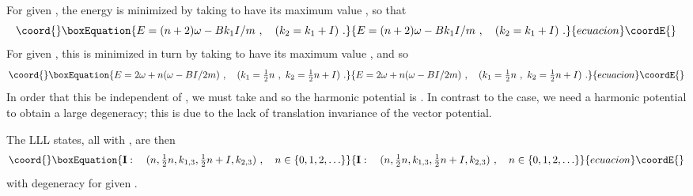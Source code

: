 \documentclass[a4paper,12pt]{article}
\providecommand{\half}{{\textstyle \frac{1}{2}}}
\begin{document}
For given \coordHE{}, the energy is minimized by taking \coordHE{} to have its
maximum value \coordHE{}, so that
\begin{equation}\coord{}\boxEquation{
E =  (n+2)\omega - {B} k_1 I/m\ ,\quad (k_2 = k_1 + I)\ .
}{
E =  (n+2)\omega - {B} k_1 I/m\ ,\quad (k_2 = k_1 + I)\ .
}{ecuacion}\coordE{}\end{equation}
For given \coordHE{}, this is minimized in turn by taking \coordHE{} to have its
maximum value \myHighlight{$\half n$}\coordHE{}, and so
\begin{equation}\coord{}\boxEquation{
E =  2\omega + n (\omega - {BI}/{2m}) \ ,\quad (k_1 = \half n\ ,\ k_2 =
\half n + I)\ .
}{
E =  2\omega + n (\omega - {BI}/{2m}) \ ,\quad (k_1 = \half n\ ,\ k_2 =
\half n + I)\ .
}{ecuacion}\coordE{}\end{equation}
In order that this be independent of \coordHE{}, we must take \coordHE{} and so the harmonic potential is \coordHE{}.  In
contrast to the \coordHE{} case, we need a harmonic potential to obtain a
large degeneracy; this is due to the lack of translation invariance of the
vector potential.

The LLL states, all with \coordHE{}, are then
\begin{equation}\coord{}\boxEquation{
{\bf I}:\quad (n, \half n, k_{1,3}, \half n + I, k_{2,3})\ ,\quad
n \in \{0,1,2,\ldots\}
\label{lll1}
}{
{\bf I}:\quad (n, \half n, k_{1,3}, \half n + I, k_{2,3})\ ,\quad
n \in \{0,1,2,\ldots\}
}{ecuacion}\coordE{}\end{equation}
with degeneracy \coordHE{} for given \coordHE{}.


\subsubsection{\coordHE{}}
\end{document}
